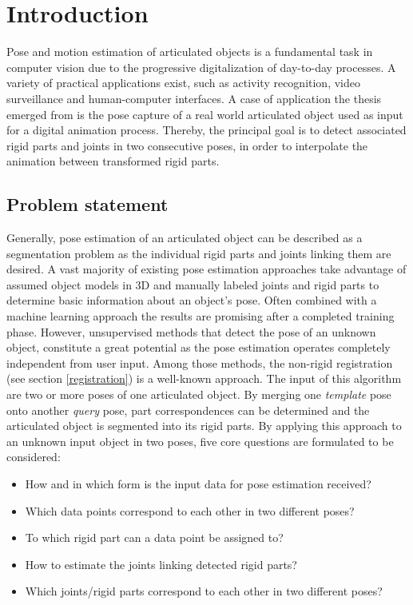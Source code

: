 \chapter{Introduction}
\label{cha:Introduction}
Pose and motion estimation of articulated objects is a fundamental task in computer vision due to the progressive digitalization of day-to-day processes. A variety of practical applications exist, such as activity recognition, video surveillance and human-computer interfaces. A case of application the thesis emerged from is the pose capture of a real world articulated object used as input for a digital animation process. Thereby, the principal goal is to detect associated rigid parts and joints in two consecutive poses, in order to interpolate the animation between transformed rigid parts.

\section{Problem statement}
Generally, pose estimation of an articulated object can be described as a segmentation problem as the individual rigid parts and joints linking them are desired. A vast majority of existing pose estimation approaches take advantage of assumed object models in 3D and manually labeled joints and rigid parts to determine basic information about an object's pose. Often combined with a machine learning approach the results are promising after a completed training phase. However, unsupervised methods that detect the pose of an unknown object, constitute a great potential as the pose estimation operates completely independent from user input. Among those methods, the non-rigid registration (see section \ref{registration}) is a well-known approach. The input of this algorithm are two or more poses of one articulated object. By merging one \textit{template} pose onto another \textit{query} pose, part correspondences can be determined and the articulated object is segmented into its rigid parts. 
By applying this approach to an unknown input object in two poses, five core questions are formulated to be considered:
\\\begin{itemize}
	\item How and in which form is the input data for pose estimation received?
	\item Which data points correspond to each other in two different poses?
	\item To which rigid part can a data point be assigned to?
	\item How to estimate the joints linking detected rigid parts?
	\item Which joints/rigid parts correspond to each other in two different poses?
\end{itemize}
